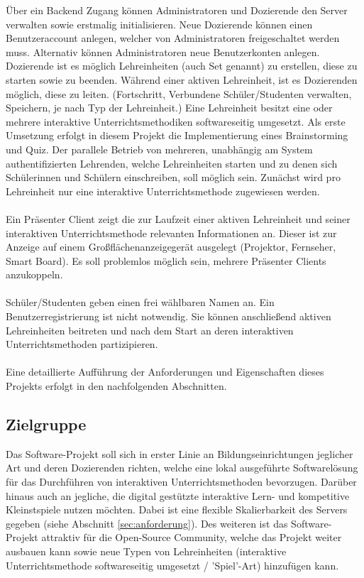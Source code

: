Über ein Backend Zugang können Administratoren und Dozierende den Server verwalten sowie erstmalig initialisieren. Neue Dozierende können einen Benutzeraccount anlegen, welcher von Administratoren freigeschaltet werden muss. Alternativ können Administratoren neue Benutzerkonten anlegen. Dozierende ist es möglich Lehreinheiten (auch Set genannt) zu erstellen, diese zu starten sowie zu beenden. Während einer aktiven Lehreinheit, ist es Dozierenden möglich, diese zu leiten. (Fortschritt, Verbundene Schüler/Studenten verwalten, Speichern, je nach Typ der Lehreinheit.) Eine Lehreinheit besitzt eine oder mehrere interaktive Unterrichtsmethodiken softwareseitig umgesetzt. Als erste Umsetzung erfolgt in diesem Projekt die Implementierung eines Brainstorming und Quiz. Der parallele Betrieb von mehreren, unabhängig am System authentifizierten Lehrenden, welche Lehreinheiten starten und zu denen sich Schülerinnen und Schülern einschreiben, soll möglich sein. Zunächst wird pro Lehreinheit nur eine interaktive Unterrichtsmethode zugewiesen werden. \\ \\

Ein Präsenter Client zeigt die zur Laufzeit einer aktiven Lehreinheit und seiner interaktiven Unterrichtsmethode relevanten Informationen an. Dieser ist zur Anzeige auf einem Großflächenanzeigegerät ausgelegt (Projektor, Fernseher, Smart Board). Es soll problemlos möglich sein, mehrere Präsenter Clients anzukoppeln. \\ \\

Schüler/Studenten geben einen frei wählbaren Namen an. Ein Benutzerregistrierung ist nicht notwendig. Sie können anschließend aktiven Lehreinheiten beitreten und nach dem Start an deren interaktiven Unterrichtsmethoden partizipieren. \\ \\

Eine detaillierte Aufführung der Anforderungen und Eigenschaften dieses Projekts erfolgt in den nachfolgenden Abschnitten. 

\subsection{Zielgruppe}\label{sec:zielgruppe}
Das Software-Projekt soll sich in erster Linie an Bildungseinrichtungen jeglicher Art und deren Dozierenden richten, welche eine lokal ausgeführte Softwarelösung für das Durchführen von interaktiven Unterrichtsmethoden bevorzugen. Darüber hinaus auch an jegliche, die digital gestützte interaktive Lern- und kompetitive Kleinstspiele nutzen möchten. Dabei ist eine flexible Skalierbarkeit des Servers gegeben (siehe Abschnitt \ref{sec:anforderung}). Des weiteren ist das Software-Projekt attraktiv für die Open-Source Community, welche das Projekt weiter ausbauen kann sowie neue Typen von Lehreinheiten (interaktive Unterrichtsmethode softwareseitig umgesetzt / 'Spiel'-Art) hinzufügen kann.
